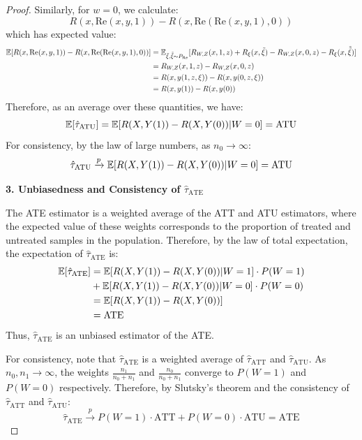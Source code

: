\documentclass{article}
\begin{document}
\begin{proof}
  Similarly, for $w = 0$, we calculate:
  \[R(x, \text{Re}(x, y, 1)) - R(x, \text{Re}(\text{Re}(x, y, 1), 0))\]
  which has expected value:
  \begin{align*}
  \mathbb{E}[R(x, \text{Re}(x, y, 1)) - R(x, \text{Re}(\text{Re}(x, y, 1), 0))] &= \mathbb{E}_{\tilde{\xi}, \tilde{\tilde{\xi}} \sim P_{\text{Re}}}[R_{W,Z}(x, 1, z) + R_\xi(x, \tilde{\xi}) - R_{W,Z}(x, 0, z) - R_\xi(x, \tilde{\tilde{\xi}})] \\
  &= R_{W,Z}(x, 1, z) - R_{W,Z}(x, 0, z) \\
  &= R(x, y(1, z, \xi)) - R(x, y(0, z, \xi)) \\
  &= R(x, y(1)) - R(x, y(0))
  \end{align*}
  Therefore, as an average over these quantities, we have:
  \[\mathbb{E}[\hat{\tau}_{\text{ATU}}] = \mathbb{E}[R(X, Y(1)) - R(X, Y(0)) | W = 0] = \text{ATU}\]
  For consistency, by the law of large numbers, as $n_0 \to \infty$:
  \[\hat{\tau}_{\text{ATU}} \xrightarrow{p} \mathbb{E}[R(X, Y(1)) - R(X, Y(0)) | W = 0] = \text{ATU}\]
  
  \textbf{3. Unbiasedness and Consistency of $\hat{\tau}_{\text{ATE}}$}
  
  The ATE estimator is a weighted average of the ATT and ATU estimators, where the expected value of these weights corresponds to the proportion of treated and untreated samples in the population. Therefore, by the law of total expectation, the expectation of $\hat{\tau}_{\text{ATE}}$ is:
  \begin{align*}
  \mathbb{E}[\hat{\tau}_{\text{ATE}}] &= \mathbb{E}[R(X, Y(1)) - R(X, Y(0)) | W = 1] \cdot P(W = 1) \\
  &+ \mathbb{E}[R(X, Y(1)) - R(X, Y(0)) | W = 0] \cdot P(W = 0) \\
  &= \mathbb{E}[R(X, Y(1)) - R(X, Y(0))] \\
  &= \text{ATE}
  \end{align*}
  Thus, $\hat{\tau}_{\text{ATE}}$ is an unbiased estimator of the ATE.

  For consistency, note that $\hat{\tau}_{\text{ATE}}$ is a weighted average of $\hat{\tau}_{\text{ATT}}$ and $\hat{\tau}_{\text{ATU}}$. As $n_0, n_1 \to \infty$, the weights $\frac{n_1}{n_0 + n_1}$ and $\frac{n_0}{n_0 + n_1}$ converge to $P(W=1)$ and $P(W=0)$ respectively. Therefore, by Slutsky's theorem and the consistency of $\hat{\tau}_{\text{ATT}}$ and $\hat{\tau}_{\text{ATU}}$:
  \[\hat{\tau}_{\text{ATE}} \xrightarrow{p} P(W=1) \cdot \text{ATT} + P(W=0) \cdot \text{ATU} = \text{ATE}\]
\end{proof}
\end{document}
